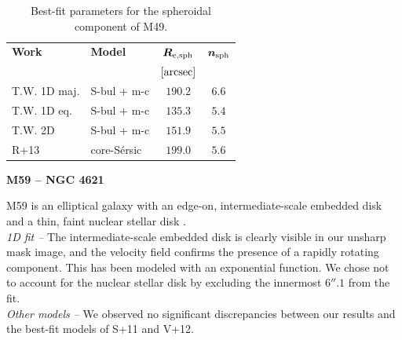 \documentclass[preprint2]{emulateapj}
\begin{document}
  \begin{table}[h]
  \small
  \caption{Best-fit parameters for the spheroidal component of M49.}
  \begin{center}
  \begin{tabular}{llcc}
  \hline
  {\bf Work} & {\bf Model}   & $\bm R_{\rm e,sph}$    & $\bm n_{\rm sph}$ \\
    &  &  $[\rm arcsec]$ & \\
  \hline
  T.W. 1D maj. & S-bul + m-c   & $190.2$  &  $6.6$ \\
  T.W. 1D eq.  & S-bul + m-c   & $135.3$  &  $5.4$ \\
  T.W. 2D      & S-bul + m-c   & $151.9$  &  $5.5$ \\
  \hline
  R+13         & core-S\'ersic & $199.0$  &  $5.6$ \\
  \hline
  \end{tabular}
  \end{center}
  \label{tab:m49}
  \end{table}

  \clearpage\newpage\noindent
  {\bf M59 -- NGC 4621 \\}

  M59 is an elliptical galaxy with an edge-on, intermediate-scale embedded disk \citep{scorzabender1995}
  and a thin, faint nuclear stellar disk \citep{ferrarese2006acsvcs,ledo2010}.\\

  \emph{1D fit -- }
  The intermediate-scale embedded disk is clearly visible in our unsharp mask image, and 
  the velocity field confirms the presence of a rapidly rotating component. 
  This has been modeled with an exponential function.
  We chose not to account for the nuclear stellar disk by excluding the innermost $6''.1$ from the fit. \\
  
  \emph{Other models -- } 
  We observed no significant discrepancies between our results and the best-fit models of S+11 and V+12.
\end{document}
